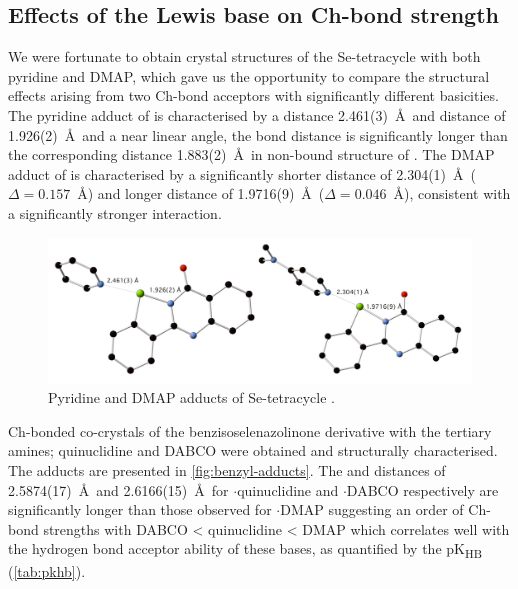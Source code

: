 \begin{refsection}
    \subsection{Effects of the Lewis base on Ch-bond strength}
    We were fortunate to obtain crystal structures of the Se-tetracycle  with both pyridine and DMAP, which gave us the opportunity to compare the structural effects arising from two Ch-bond acceptors with significantly different basicities.
    The pyridine adduct of  is characterised by a  distance 2.461(3)~\AA\ and  distance of 1.926(2)~\AA\ and a near linear  angle, the  bond distance is significantly longer than the corresponding distance 1.883(2)~\AA\ in non-bound structure of .
    The DMAP adduct of  is characterised by a significantly shorter  distance of 2.304(1)~\AA\ ($ \Delta = 0.157$~\AA) and longer  distance of 1.9716(9)~\AA\ ($ \Delta = 0.046$~\AA), consistent with a significantly stronger interaction.
    
    \begin{figure}
      \centering
      \includegraphics[width=0.8\linewidth]{Figures/dimer-dmap-py-xray.pdf}
      \caption{Pyridine and DMAP adducts of Se-tetracycle .}\label{fig:dimer-adducts}
    \end{figure}
    
    Ch-bonded co-crystals of the benzisoselenazolinone derivative  with the tertiary amines; quinuclidine and DABCO were obtained and structurally characterised.
    The adducts are presented in \cref{fig:benzyl-adducts}.
    The  and  distances of 2.5874(17)~\AA\ and 2.6166(15)~\AA\ for $ \cdot $quinuclidine and $ \cdot $DABCO respectively are significantly longer than those observed for $ \cdot $DMAP suggesting an order of Ch-bond strengths with  DABCO < quinuclidine < DMAP which correlates well with the hydrogen bond acceptor ability of these bases, as quantified by the pK\textsubscript{HB} (\cref{tab:pkhb}).
    

\end{refsection}
